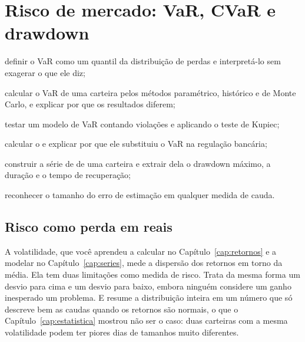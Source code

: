 \chapter{Risco de mercado: VaR, CVaR e drawdown}
\label{cap:risco}


\begin{objetivos}
  \item definir o VaR como um quantil da distribuição de perdas e interpretá-lo sem exagerar o que ele diz;
  \item calcular o VaR de uma carteira pelos métodos paramétrico, histórico e de Monte Carlo, e explicar por que os resultados diferem;
  \item testar um modelo de VaR contando violações e aplicando o teste de Kupiec;
  \item calcular o  e explicar por que ele substituiu o VaR na regulação bancária;
  \item construir a série de  de uma carteira e extrair dela o drawdown máximo, a duração e o tempo de recuperação;
  \item reconhecer o tamanho do erro de estimação em qualquer medida de cauda.
\end{objetivos}

\section{Risco como perda em reais}

A volatilidade, que você aprendeu a calcular no Capítulo~\ref{cap:retornos} e a modelar no Capítulo~\ref{cap:series}, mede a dispersão dos retornos em torno da média. Ela tem duas limitações como medida de risco. Trata da mesma forma um desvio para cima e um desvio para baixo, embora ninguém considere um ganho inesperado um problema. E resume a distribuição inteira em um número que só descreve bem as caudas quando os retornos são normais, o que o Capítulo~\ref{cap:estatistica} mostrou não ser o caso: duas carteiras com a mesma volatilidade podem ter piores dias de tamanhos muito diferentes.


